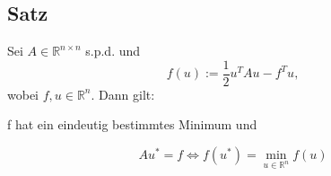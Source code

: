 \subsection{Satz}
Sei $A\in\mathbb{R}^{n \times n}$ s.p.d. und
\begin{equation}
f(u) := \frac {1} {2} u^{T}Au - f^{T}u,
\end{equation}
wobei $f,u \in \mathbb{R}^{n}$. Dann gilt:
\begin{center}
f hat ein eindeutig bestimmtes Minimum und
\end{center}
\begin{equation}
Au^{*} = f \Longleftrightarrow f(u^{*}) = \underset{u\in\mathbb{R}^{n}}{\min} f(u)
\end{equation}



